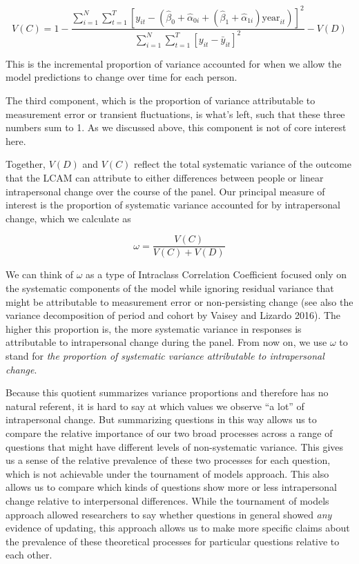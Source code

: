 \documentclass[
  12pt,
]{article}
\begin{document}
\[
V(C) = 1 - \frac{\sum_{i=1}^N \sum_{t=1}^T [y_{it} - (\hat{\beta}_0 + \hat{\alpha}_{0i} + (\hat{\beta}_1 + \hat{\alpha}_{1i}) \text{year}_{it})]^2}{\sum_{i=1}^N \sum_{t=1}^T [y_{it} - \bar{y}_{it}]^2} - V(D)
\]

This is the incremental proportion of variance accounted for when we
allow the model predictions to change over time for each person.

The third component, which is the proportion of variance attributable to
measurement error or transient fluctuations, is what's left, such that
these three numbers sum to 1. As we discussed above, this component is
not of core interest here.

Together, \(V(D)\) and \(V(C)\) reflect the total systematic variance of
the outcome that the LCAM can attribute to either differences between
people or linear intrapersonal change over the course of the panel. Our
principal measure of interest is the proportion of systematic variance
accounted for by intrapersonal change, which we calculate as

\[
\omega = \frac{V(C)}{V(C) + V(D)}
\]

We can think of \(\omega\) as a type of Intraclass Correlation
Coefficient focused only on the systematic components of the model while
ignoring residual variance that might be attributable to measurement
error or non-persisting change (see also the variance decomposition of
period and cohort by Vaisey and Lizardo 2016). The higher this
proportion is, the more systematic variance in responses is attributable
to intrapersonal change during the panel. From now on, we use \(\omega\)
to stand for \emph{the proportion of systematic variance attributable to
intrapersonal change}.

Because this quotient summarizes variance proportions and therefore has
no natural referent, it is hard to say at which values we observe ``a
lot'' of intrapersonal change. But summarizing questions in this way
allows us to compare the relative importance of our two broad processes
across a range of questions that might have different levels of
non-systematic variance. This gives us a sense of the relative
prevalence of these two processes for each question, which is not
achievable under the tournament of models approach. This also allows us
to compare which kinds of questions show more or less intrapersonal
change relative to interpersonal differences. While the tournament of
models approach allowed researchers to say whether questions in general
showed \emph{any} evidence of updating, this approach allows us to make
more specific claims about the prevalence of these theoretical processes
for particular questions relative to each other.
\end{document}
